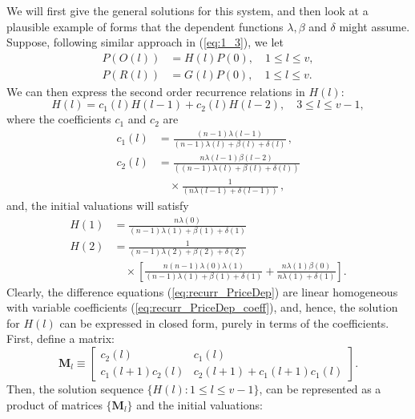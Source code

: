 \documentclass{article}
\begin{document}
We will first give the general solutions for this system, and then
look at a plausible example of forms that the dependent functions
$\lambda, \beta$ and $\delta$ might assume. Suppose, following
similar approach in (\ref{eq:1_3}), we let
\begin{align*}
P(O(l)) &= H(l) P(0),  \quad 1\leq  l \leq v, \\
P(R(l)) &= G(l) P(0), \quad 1 \leq l \leq v.
\end{align*}
We can then express the second order recurrence relations in
$H(l)$:
\begin{equation}\label{eq:recurr_PriceDep}
H(l) = c_1(l) H(l-1) + c_2(l) H(l-2), \quad 3 \leq l \leq v-1,
\end{equation}
where the coefficients $c_1$ and $c_2$ are
\begin{align}\label{eq:recurr_PriceDep_coeff}
c_1(l) &=
\frac{(n-1)\lambda(l-1)}{(n-1)\lambda(l)+\beta(l)+\delta(l)} \, ,\\
c_2(l) &= \frac{n\lambda(l-1)
\beta(l-2)}{\left((n-1)\lambda(l)+\beta(l)+\delta(l)\right) } \nonumber\\
&\quad \times \frac{1}{\left( n\lambda(l-1)+\delta(l-1)\right)} \,
,\nonumber
\end{align}
and, the initial valuations will satisfy
\begin{align}
H(1) &=
\frac{n\lambda(0)}{(n-1)\lambda(1)+\beta(1)+\delta(1)} \\
H(2) &= \frac{1}{(n-1)\lambda(2)+\beta(2)+\delta(2)} \nonumber\\
&\quad\times\left[\frac{n(n-1)\lambda(0)\lambda(1)}{(n-1)\lambda(1)+\beta(1)+\delta(1)}+
\frac{n\lambda(1)\beta(0)}{n\lambda(1)+\delta(1)} \right]
\nonumber.
\end{align}
Clearly, the difference equations (\ref{eq:recurr_PriceDep}) are
linear homogeneous with variable coefficients
(\ref{eq:recurr_PriceDep_coeff}), and, hence, the solution for
$H(l)$ can be expressed in closed form, purely in terms of the
coefficients\cite{popenda87,mallik97,boese02}. First, define a
matrix:
\begin{equation}
\mathbf{M}_l \equiv \begin{bmatrix}
c_2(l) & c_1(l) \\
c_1(l+1)c_2(l) & c_2(l+1)+c_1(l+1)c_1(l)
\end{bmatrix}.
\end{equation}
Then, the solution sequence $\{H(l): 1\leq l \leq v-1\}$, can be
represented as a product of matrices $\{\mathbf{M}_l\}$ and the
initial valuations:
\end{document}
